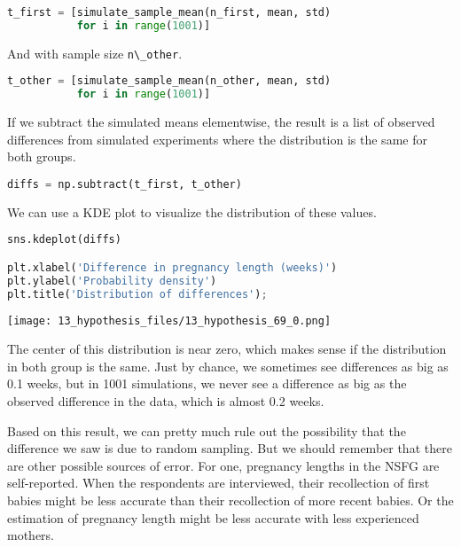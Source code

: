 \begin{lstlisting}[language=Python,style=source]
t_first = [simulate_sample_mean(n_first, mean, std)
           for i in range(1001)]
\end{lstlisting}

And with sample size \passthrough{\lstinline!n\_other!}.

\begin{lstlisting}[language=Python,style=source]
t_other = [simulate_sample_mean(n_other, mean, std)
           for i in range(1001)]
\end{lstlisting}

If we subtract the simulated means elementwise, the result is a list of
observed differences from simulated experiments where the distribution
is the same for both groups.

\begin{lstlisting}[language=Python,style=source]
diffs = np.subtract(t_first, t_other)
\end{lstlisting}

We can use a KDE plot to visualize the distribution of these values.

\begin{lstlisting}[language=Python,style=source]
sns.kdeplot(diffs)

plt.xlabel('Difference in pregnancy length (weeks)')
plt.ylabel('Probability density')
plt.title('Distribution of differences');
\end{lstlisting}

\begin{center}
\texttt{[image: 13\_hypothesis\_files/13\_hypothesis\_69\_0.png]}
\end{center}

The center of this distribution is near zero, which makes sense if the
distribution in both group is the same. Just by chance, we sometimes see
differences as big as 0.1 weeks, but in 1001 simulations, we never see a
difference as big as the observed difference in the data, which is
almost 0.2 weeks.

Based on this result, we can pretty much rule out the possibility that
the difference we saw is due to random sampling. But we should remember
that there are other possible sources of error. For one, pregnancy
lengths in the NSFG are self-reported. When the respondents are
interviewed, their recollection of first babies might be less accurate
than their recollection of more recent babies. Or the estimation of
pregnancy length might be less accurate with less experienced mothers.

